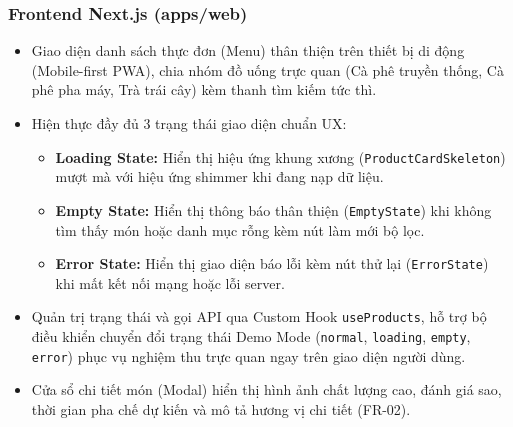 \documentclass[a4paper]{article}
\begin{document}
\subsubsection{Frontend Next.js (apps/web)}
\begin{itemize}
    \item Giao diện danh sách thực đơn (Menu) thân thiện trên thiết bị di động (Mobile-first PWA), chia nhóm đồ uống trực quan (Cà phê truyền thống, Cà phê pha máy, Trà trái cây) kèm thanh tìm kiếm tức thì.
    \item Hiện thực đầy đủ 3 trạng thái giao diện chuẩn UX:
    \begin{itemize}
        \item \textbf{Loading State:} Hiển thị hiệu ứng khung xương (\texttt{ProductCardSkeleton}) mượt mà với hiệu ứng shimmer khi đang nạp dữ liệu.
        \item \textbf{Empty State:} Hiển thị thông báo thân thiện (\texttt{EmptyState}) khi không tìm thấy món hoặc danh mục rỗng kèm nút làm mới bộ lọc.
        \item \textbf{Error State:} Hiển thị giao diện báo lỗi kèm nút thử lại (\texttt{ErrorState}) khi mất kết nối mạng hoặc lỗi server.
    \end{itemize}
    \item Quản trị trạng thái và gọi API qua Custom Hook \texttt{useProducts}, hỗ trợ bộ điều khiển chuyển đổi trạng thái Demo Mode (\texttt{normal}, \texttt{loading}, \texttt{empty}, \texttt{error}) phục vụ nghiệm thu trực quan ngay trên giao diện người dùng.
    \item Cửa sổ chi tiết món (Modal) hiển thị hình ảnh chất lượng cao, đánh giá sao, thời gian pha chế dự kiến và mô tả hương vị chi tiết (FR-02).
\end{itemize}
\end{document}
